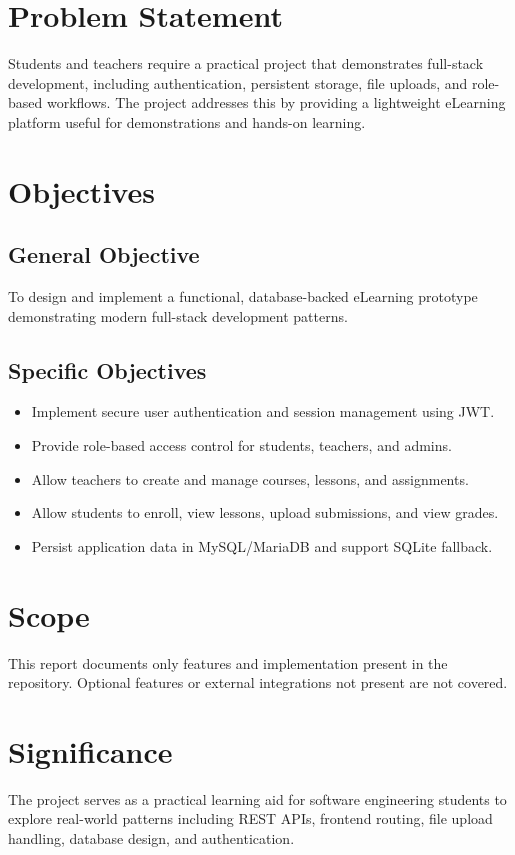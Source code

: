 \documentclass[12pt,a4paper]{report}
\begin{document}
\section{Problem Statement}
Students and teachers require a practical project that demonstrates full-stack development, including authentication, persistent storage, file uploads, and role-based workflows. The project addresses this by providing a lightweight eLearning platform useful for demonstrations and hands-on learning.

\section{Objectives}
\subsection{General Objective}
To design and implement a functional, database-backed eLearning prototype demonstrating modern full-stack development patterns.

\subsection{Specific Objectives}
\begin{itemize}
  \item Implement secure user authentication and session management using JWT.
  \item Provide role-based access control for students, teachers, and admins.
  \item Allow teachers to create and manage courses, lessons, and assignments.
  \item Allow students to enroll, view lessons, upload submissions, and view grades.
  \item Persist application data in MySQL/MariaDB and support SQLite fallback.
\end{itemize}

\section{Scope}
This report documents only features and implementation present in the repository. Optional features or external integrations not present are not covered.

\section{Significance}
The project serves as a practical learning aid for software engineering students to explore real-world patterns including REST APIs, frontend routing, file upload handling, database design, and authentication.
\end{document}
